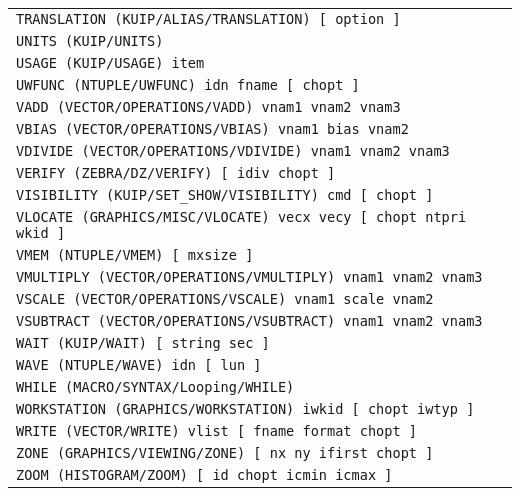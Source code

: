 \begin{longtable}{|>{\footnotesize\tt}lr|}
TRANSLATION (KUIP/ALIAS/TRANSLATION)  [ option ] & \pageref{ref:KUIP/ALIAS/TRANSLATION}\\ 
UNITS (KUIP/UNITS)  & \pageref{ref:KUIP/UNITS}\\ 
USAGE (KUIP/USAGE)  item & \pageref{ref:KUIP/USAGE}\\ 
UWFUNC (NTUPLE/UWFUNC)  idn fname [ chopt ] & \pageref{ref:NTUPLE/UWFUNC}\\ 
VADD (VECTOR/OPERATIONS/VADD)  vnam1 vnam2 vnam3 & \pageref{ref:VECTOR/OPERATIONS/VADD}\\ 
VBIAS (VECTOR/OPERATIONS/VBIAS)  vnam1 bias vnam2 & \pageref{ref:VECTOR/OPERATIONS/VBIAS}\\ 
VDIVIDE (VECTOR/OPERATIONS/VDIVIDE)  vnam1 vnam2 vnam3 & \pageref{ref:VECTOR/OPERATIONS/VDIVIDE}\\ 
VERIFY (ZEBRA/DZ/VERIFY)  [ idiv chopt ] & \pageref{ref:ZEBRA/DZ/VERIFY}\\ 
VISIBILITY (KUIP/SET_SHOW/VISIBILITY)  cmd [ chopt ] & \pageref{ref:KUIP/SET_SHOW/VISIBILITY}\\ 
VLOCATE (GRAPHICS/MISC/VLOCATE)  vecx vecy [ chopt ntpri wkid ] & \pageref{ref:GRAPHICS/MISC/VLOCATE}\\ 
VMEM (NTUPLE/VMEM)  [ mxsize ] & \pageref{ref:NTUPLE/VMEM}\\ 
VMULTIPLY (VECTOR/OPERATIONS/VMULTIPLY)  vnam1 vnam2 vnam3 & \pageref{ref:VECTOR/OPERATIONS/VMULTIPLY}\\ 
VSCALE (VECTOR/OPERATIONS/VSCALE)  vnam1 scale vnam2 & \pageref{ref:VECTOR/OPERATIONS/VSCALE}\\ 
VSUBTRACT (VECTOR/OPERATIONS/VSUBTRACT)  vnam1 vnam2 vnam3 & \pageref{ref:VECTOR/OPERATIONS/VSUBTRACT}\\ 
WAIT (KUIP/WAIT)  [ string sec ] & \pageref{ref:KUIP/WAIT}\\ 
WAVE (NTUPLE/WAVE)  idn [ lun ] & \pageref{ref:NTUPLE/WAVE}\\ 
WHILE (MACRO/SYNTAX/Looping/WHILE)  & \pageref{ref:MACRO/SYNTAX/Looping/WHILE}\\ 
WORKSTATION (GRAPHICS/WORKSTATION)  iwkid [ chopt iwtyp ] & \pageref{ref:GRAPHICS/WORKSTATION}\\ 
WRITE (VECTOR/WRITE)  vlist [ fname format chopt ] & \pageref{ref:VECTOR/WRITE}\\ 
ZONE (GRAPHICS/VIEWING/ZONE)  [ nx ny ifirst chopt ] & \pageref{ref:GRAPHICS/VIEWING/ZONE}\\ 
ZOOM (HISTOGRAM/ZOOM)  [ id chopt icmin icmax ] & \pageref{ref:HISTOGRAM/ZOOM}\\ 
\end{longtable}

\endinput

